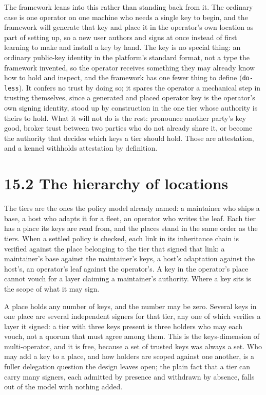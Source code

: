 The framework leans into this rather than standing back from it. The
ordinary case is one operator on one machine who needs a single key to
begin, and the framework will generate that key and place it in the
operator's own location as part of setting up, so a new user authors and
signs at once instead of first learning to make and install a key by
hand. The key is no special thing: an ordinary public-key identity in
the platform's standard format, not a type the framework invented, so
the operator receives something they may already know how to hold and
inspect, and the framework has one fewer thing to define
(\texttt{do-less}). It confers no trust by doing so; it spares the
operator a mechanical step in trusting themselves, since a generated and
placed operator key is the operator's own signing identity, stood up by
construction in the one tier whose authority is theirs to hold. What it
will not do is the rest: pronounce another party's key good, broker
trust between two parties who do not already share it, or become the
authority that decides which keys a tier should hold. Those are
attestation, and a kennel withholds attestation by definition.

\hypertarget{the-hierarchy-of-locations}{%
\section{15.2 The hierarchy of
locations}\label{the-hierarchy-of-locations}}

The tiers are the ones the policy model already named: a maintainer who
ships a base, a host who adapts it for a fleet, an operator who writes
the leaf. Each tier has a place its keys are read from, and the places
stand in the same order as the tiers. When a settled policy is checked,
each link in its inheritance chain is verified against the place
belonging to the tier that signed that link: a maintainer's base against
the maintainer's keys, a host's adaptation against the host's, an
operator's leaf against the operator's. A key in the operator's place
cannot vouch for a layer claiming a maintainer's authority. Where a key
sits is the scope of what it may sign.

A place holds any number of keys, and the number may be zero. Several
keys in one place are several independent signers for that tier, any one
of which verifies a layer it signed: a tier with three keys present is
three holders who may each vouch, not a quorum that must agree among
them. This is the keys-dimension of multi-operator, and it is free,
because a set of trusted keys was always a set. Who may add a key to a
place, and how holders are scoped against one another, is a fuller
delegation question the design leaves open; the plain fact that a tier
can carry many signers, each admitted by presence and withdrawn by
absence, falls out of the model with nothing added.

